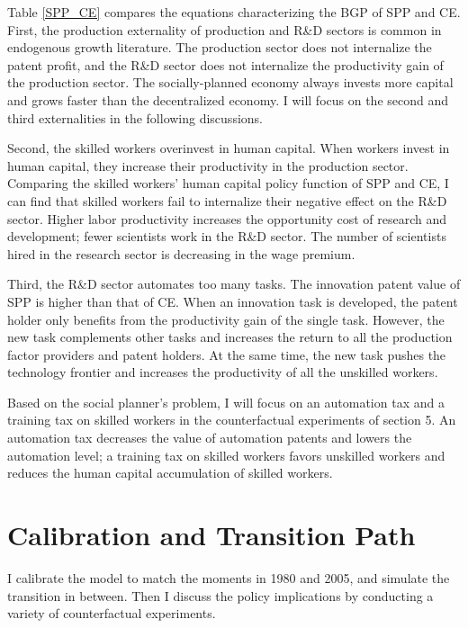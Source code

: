 \documentclass[12pt]{article}
\begin{document}
Table \ref{SPP_CE} compares the equations characterizing the BGP of SPP and CE. First, the production externality of production and R\&D sectors is common in endogenous growth literature. The production sector does not internalize the patent profit, and the R\&D sector does not internalize the productivity gain of the production sector. The socially-planned economy always invests more capital and grows faster than the decentralized economy. I will focus on the second and third externalities in the following discussions.

Second, the skilled workers overinvest in human capital. When workers invest in human capital, they increase their productivity in the production sector. Comparing the skilled workers' human capital policy function of SPP and CE, I can find that skilled workers fail to internalize their negative effect on the R\&D sector. Higher labor productivity increases the opportunity cost of research and development; fewer scientists work in the R\&D sector. The number of scientists hired in the research sector is decreasing in the wage premium.

Third, the R\&D sector automates too many tasks. The innovation patent value of SPP is higher than that of CE. When an innovation task is developed, the patent holder only benefits from the productivity gain of the single task. However, the new task complements other tasks and increases the return to all the production factor providers and patent holders. At the same time, the new task pushes the technology frontier and increases the productivity of all the unskilled workers. 

Based on the social planner's problem, I will focus on an automation tax and a training tax on skilled workers in the counterfactual experiments of section 5. An automation tax decreases the value of automation patents and lowers the automation level; a training tax on skilled workers favors unskilled workers and reduces the human capital accumulation of skilled workers.

\section{Calibration and Transition Path}
I calibrate the model to match the moments in 1980 and 2005, and simulate the transition in between. Then I discuss the policy implications by conducting a variety of counterfactual experiments. 
\end{document}

